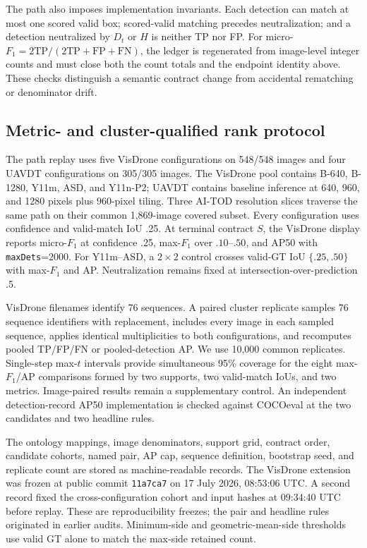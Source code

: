 \documentclass[journal]{IEEEtran}
\begin{document}
The path also imposes implementation invariants. Each detection can match at most one scored valid box; scored-valid matching precedes neutralization; and a detection neutralized by $D_t$ or $H$ is neither TP nor FP. For micro-$F_1=2\mathrm{TP}/(2\mathrm{TP}+\mathrm{FP}+\mathrm{FN})$, the ledger is regenerated from image-level integer counts and must close both the count totals and the endpoint identity above. These checks distinguish a semantic contract change from accidental rematching or denominator drift.

\subsection{Metric- and cluster-qualified rank protocol}
The path replay uses five VisDrone configurations on 548/548 images and four UAVDT configurations on 305/305 images. The VisDrone pool contains B-640, B-1280, Y11m, ASD, and Y11n-P2; UAVDT contains baseline inference at 640, 960, and 1280 pixels plus 960-pixel tiling. Three AI-TOD resolution slices traverse the same path on their common 1,869-image covered subset. Every configuration uses confidence and valid-match IoU .25. At terminal contract $S$, the VisDrone display reports micro-$F_1$ at confidence .25, max-$F_1$ over $.10$--$.50$, and AP50 with \texttt{maxDets}=2000. For Y11m--ASD, a $2\!\times\!2$ control crosses valid-GT IoU $\{.25,.50\}$ with max-$F_1$ and AP. Neutralization remains fixed at intersection-over-prediction .5.

VisDrone filenames identify 76 sequences. A paired cluster replicate samples 76 sequence identifiers with replacement, includes every image in each sampled sequence, applies identical multiplicities to both configurations, and recomputes pooled TP/FP/FN or pooled-detection AP. We use 10,000 common replicates. Single-step max-$t$ intervals provide simultaneous 95\% coverage for the eight max-$F_1$/AP comparisons formed by two supports, two valid-match IoUs, and two metrics. Image-paired results remain a supplementary control. An independent detection-record AP50 implementation is checked against COCOeval at the two candidates and two headline rules.

The ontology mappings, image denominators, support grid, contract order, candidate cohorts, named pair, AP cap, sequence definition, bootstrap seed, and replicate count are stored as machine-readable records. The VisDrone extension was frozen at public commit \texttt{11a7ca7} on 17 July 2026, 08:53:06 UTC. A second record fixed the cross-configuration cohort and input hashes at 09:34:40 UTC before replay. These are reproducibility freezes; the pair and headline rules originated in earlier audits. Minimum-side and geometric-mean-side thresholds use valid GT alone to match the max-side retained count.
\end{document}
